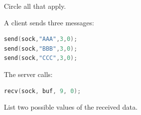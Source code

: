 \begin{questions}
	Circle all that apply.

	\question[15]

	A client sends three messages:

	\begin{lstlisting}[language=C]
send(sock,"AAA",3,0);
send(sock,"BBB",3,0);
send(sock,"CCC",3,0);
\end{lstlisting}

	The server calls:

	\begin{lstlisting}[language=C]
recv(sock, buf, 9, 0);
\end{lstlisting}

	List two possible values of the received data.

\end{questions}

